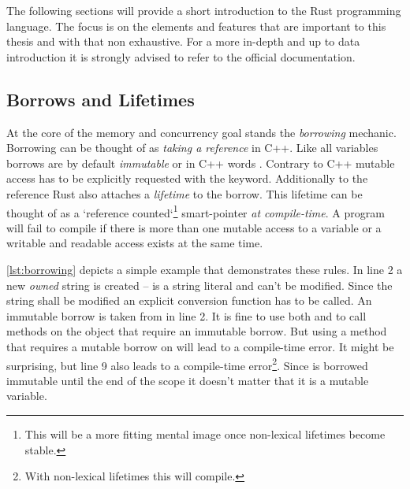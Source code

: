 \documentclass[thesis]{subfiles}
\begin{document}
  The following sections will provide a short introduction to the Rust programming language.
  The focus is on the elements and features that are important to this thesis and with that non exhaustive.
  For a more in-depth and up to data introduction it is strongly advised to refer to the official documentation.

  \subsection{Borrows and Lifetimes}\label{sec:rustBorr}
    At the core of the memory and concurrency goal stands the \emph{borrowing} mechanic.
    Borrowing can be thought of as \emph{taking a reference} in C++.
    Like all variables borrows are by default \emph{immutable} or in C++ words .
    Contrary to C++ mutable access has to be explicitly requested with the  keyword.
    Additionally to the reference Rust also attaches a \emph{lifetime} to the borrow.
    This lifetime can be thought of as a `reference counted`\footnote{%
      This will be a more fitting mental image once non-lexical lifetimes become stable.
    } smart-pointer \emph{at compile-time}.
    A program will fail to compile if there is more than one mutable access to a variable or a writable and readable access exists at the same time.

    

    \autoref{lst:borrowing} depicts a simple example that demonstrates these rules.
    In line 2 a new \emph{owned} string is created --  is a string literal and can't be modified.
    Since the string shall be modified an explicit conversion function has to be called.
    An immutable borrow is taken from  in line 2.
    It is fine to use both  and  to call methods on the object that require an immutable borrow.
    But using a method that requires a mutable borrow on  will lead to a compile-time error.
    It might be surprising, but line 9 also leads to a compile-time error\footnote{%
      With non-lexical lifetimes this will compile.
    }.
    Since  is borrowed immutable until the end of the scope it doesn't matter that it is a mutable variable.

    \newsavebox{\lifetimeErrBox}
    \begin{lrbox}{\lifetimeErrBox}%
      \begin{minipage}{.45\linewidth}
        
      \end{minipage}
    \end{lrbox}
\end{document}
